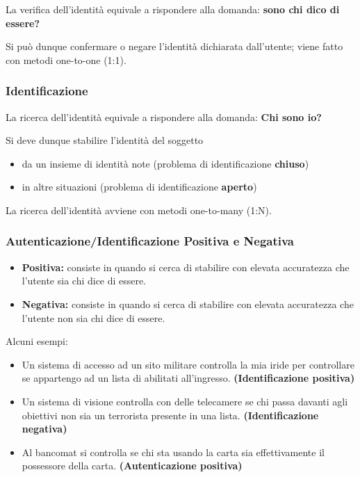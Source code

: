La verifica dell'identità equivale a rispondere alla domanda: \textbf{sono chi dico di essere?}

\noindent Si può dunque confermare o negare l'identità dichiarata dall'utente; viene fatto con metodi one-to-one (1:1).

\subsubsection{Identificazione}

La ricerca dell'identità equivale a rispondere alla domanda: \textbf{Chi sono io?}

Si deve dunque stabilire l'identità del soggetto
\begin{itemize}
    \item da un insieme di identità note (problema di identificazione \textbf{chiuso})
    \item in altre situazioni (problema di identificazione \textbf{aperto})
\end{itemize}
La ricerca dell'identità avviene con metodi one-to-many (1:N).

\subsubsection{Autenticazione/Identificazione Positiva e Negativa}

\begin{itemize}
    \item \textbf{Positiva:} consiste in quando si cerca di stabilire con elevata accuratezza che l'utente sia chi dice di essere.
    \item \textbf{Negativa:} consiste in quando si cerca di stabilire con elevata accuratezza che l'utente non sia chi dice di essere.
\end{itemize}

Alcuni esempi:
\begin{itemize}
    \item Un sistema di accesso ad un sito militare controlla la mia iride
    per controllare se appartengo ad un lista di abilitati all’ingresso. \textbf{(Identificazione positiva)}
    \item Un sistema di visione controlla con delle telecamere se chi
    passa davanti agli obiettivi non sia un terrorista presente in
    una lista. \textbf{(Identificazione negativa)}
    \item Al bancomat si controlla se chi sta usando la carta sia
    effettivamente il possessore della carta. \textbf{(Autenticazione positiva)}
\end{itemize}

